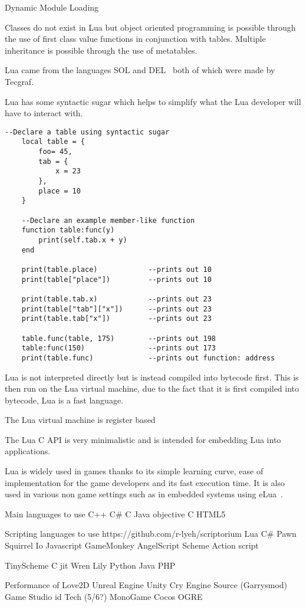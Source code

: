 \documentclass[11pt,a4paper,titlepage]{article}
\begin{document}
		Dynamic Module Loading

		Classes do not exist in Lua but object oriented programming is possible through the use of first class value functions in conjunction with tables. Multiple inheritance is possible through the use of metatables.
		
		Lua came from the languages SOL and DEL~\cite{Ierusalimschy01theevolution} both of which were made by Tecgraf.

		Lua has some syntactic sugar which helps to simplify what the Lua developer will have to interact with.

		\begin{minipage}{\linewidth}
			\begin{lstlisting}[style=C++]
	--Declare a table using syntactic sugar
	local table = {
		foo= 45,
		tab = {
			x = 23
		},
		place = 10
	}
	
	--Declare an example member-like function
	function table:func(y)
		print(self.tab.x + y)
	end

	print(table.place) 			  --prints out 10
	print(table["place"])         --prints out 10

	print(table.tab.x) 			  --prints out 23
	print(table["tab"]["x"])      --prints out 23
	print(table.tab["x"])         --prints out 23

	table.func(table, 175)        --prints out 198
	table:func(150)			      --prints out 173
	print(table.func)             --prints out function: address
			\end{lstlisting}
		\end{minipage}

		Lua is not interpreted directly but is instead compiled into bytecode first. This is then run on the Lua virtual machine, due to the fact that it is first compiled into bytecode, Lua is a fast language.

		The Lua virtual machine is register based

		The Lua C API is very minimalistic and is intended for embedding Lua into applications.

		Lua is widely used in games thanks to its simple learning curve, ease of implementation for the game developers and its fast execution time. It is also used in various non game settings such as in embedded systems using eLua~\cite{eLua}.
		
		\newpage

		Main languages to use
			C++
			C\#
			C
			Java
			objective C
			HTML5
			

		Scripting languages to use https://github.com/r-lyeh/scriptorium
			Lua
			C\# %
			Pawn
			Squirrel
			Io
			Javascript
			GameMonkey
			AngelScript
			Scheme
			Action script

			TinyScheme
			C jit
			Wren
			Lily
			Python
			Java
			PHP
	
		Performance of
			Love2D
			Unreal 
			Engine 
			Unity 
			Cry Engine 
			Source (Garrysmod)
			Game Studio
			id Tech (5/6?)
			MonoGame
			Cocos
			OGRE
			
\newpage
\printbibliography{}
\end{document}
